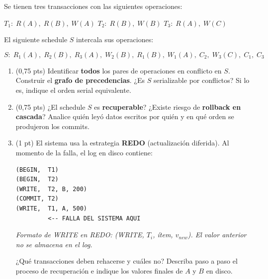 \documentclass[11pt,a4paper]{article}
\begin{document}
Se tienen tres transacciones con las siguientes operaciones:

\begin{center}
$T_1:\; R(A),\; R(B),\; W(A)$ \qquad
$T_2:\; R(B),\; W(B)$ \qquad
$T_3:\; R(A),\; W(C)$
\end{center}

El siguiente schedule $S$ intercala sus operaciones:

\[
S:\; R_1(A),\; R_2(B),\; R_3(A),\; W_2(B),\; R_1(B),\; W_1(A),\; C_2,\; W_3(C),\; C_1,\; C_3
\]

\begin{enumerate}
  \item (0{,}75 pts) Identificar \textbf{todos} los pares de operaciones en conflicto en $S$. Construir el \textbf{grafo de precedencias}. ¿Es $S$ serializable por conflictos? Si lo es, indique el orden serial equivalente.

  \vspace{5cm}

  \item (0{,}75 pts) ¿El schedule $S$ es \textbf{recuperable}? ¿Existe riesgo de \textbf{rollback en cascada}? Analice quién leyó datos escritos por quién y en qué orden se produjeron los commits.

  \vspace{4cm}

  \item (1 pt) El sistema usa la estrategia \textbf{REDO} (actualización diferida). Al momento de la falla, el log en disco contiene:

\begin{lstlisting}[style=log]
(BEGIN,  T1)
(BEGIN,  T2)
(WRITE,  T2, B, 200)
(COMMIT, T2)
(WRITE,  T1, A, 500)
         <-- FALLA DEL SISTEMA AQUI
\end{lstlisting}

  \noindent\small\textit{Formato de WRITE en REDO: (WRITE, $T_i$, ítem, $v_{new}$). El valor anterior no se almacena en el log.}

  \normalsize\vspace{4pt}
  ¿Qué transacciones deben rehacerse y cuáles no? Describa paso a paso el proceso de recuperación e indique los valores finales de $A$ y $B$ en disco.

  \vspace{4.5cm}
\end{enumerate}

\newpage

\end{document}
